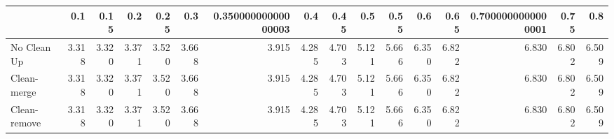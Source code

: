 \begin{tabular}{lrrrrrrrrrrrrrrr}
\toprule
{} &   0.1 &  0.15 &   0.2 &  0.25 &   0.3 & 0.35000000000000003 &   0.4 &  0.45 &   0.5 &  0.55 &   0.6 &  0.65 & 0.7000000000000001 &  0.75 &   0.8 \\
\midrule
No Clean Up  & 3.318 & 3.320 & 3.371 & 3.520 & 3.668 &               3.915 & 4.285 & 4.703 & 5.121 & 5.666 & 6.350 & 6.822 &              6.830 & 6.802 & 6.509 \\
Clean-merge  & 3.318 & 3.320 & 3.371 & 3.520 & 3.668 &               3.915 & 4.285 & 4.703 & 5.121 & 5.666 & 6.350 & 6.822 &              6.830 & 6.802 & 6.509 \\
Clean-remove & 3.318 & 3.320 & 3.371 & 3.520 & 3.668 &               3.915 & 4.285 & 4.703 & 5.121 & 5.666 & 6.350 & 6.822 &              6.830 & 6.802 & 6.509 \\
\bottomrule
\end{tabular}
